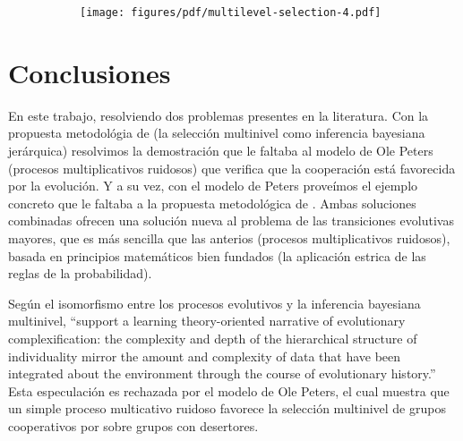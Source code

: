 \documentclass[a4paper,10pt]{article}
\begin{document}
\begin{figure}[H]
    \centering
    \begin{subfigure}[b]{0.66\textwidth}
    \texttt{[image: figures/pdf/multilevel-selection-4.pdf]}
    \end{subfigure}
    \caption{
    }
    \label{fig:multilevel-selection-4}
\end{figure}

\section{Conclusiones}




En este trabajo, resolviendo dos problemas presentes en la literatura.
Con la propuesta metodológia de \cite{czegel2019-bayesianEvolution} (la selección multinivel como inferencia bayesiana jerárquica) resolvimos la demostración que le faltaba al modelo de Ole Peters (procesos multiplicativos ruidosos) que verifica que la cooperación está favorecida por la evolución.
Y a su vez, con el modelo de Peters proveímos el ejemplo concreto que le faltaba a la propuesta metodológica de \cite{czegel2019-bayesianEvolution}.
Ambas soluciones combinadas ofrecen una solución nueva al problema de las transiciones evolutivas mayores, que es más sencilla que las anterios (procesos multiplicativos ruidosos), basada en principios matemáticos bien fundados (la aplicación estrica de las reglas de la probabilidad).

Según \cite{czegel2019-bayesianEvolution} el isomorfismo entre los procesos evolutivos y la inferencia bayesiana multinivel,  ``support a learning theory-oriented narrative of evolutionary complexification: the complexity and depth of the hierarchical structure of individuality mirror the amount and complexity of data that have been integrated about the environment through the course of evolutionary history.''
Esta especulación es rechazada por el modelo de Ole Peters, el cual muestra que un simple proceso multicativo ruidoso favorece la selección multinivel de grupos cooperativos por sobre grupos con desertores.
\end{document}
